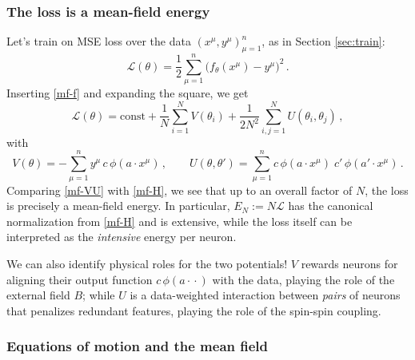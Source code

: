 \documentclass[11pt]{article}
\newcommand{\CL}{{\mathcal L}}
\begin{document}
\subsubsection{The loss is a mean-field energy}

Let's train on MSE loss over the data $(x^\mu,y^\mu)_{\mu=1}^n$, as in Section \ref{sec:train}:
%
\begin{equation}
    \CL(\theta) = \frac{1}{2}\sum_{\mu=1}^n \big(f_\theta(x^\mu)-y^\mu\big)^2\,.
\end{equation}
%
Inserting \eqref{mf-f} and expanding the square, we get
%
\begin{equation} \label{mf-VU}
    \CL(\theta) = \text{const} + \frac{1}{N}\sum_{i=1}^N V(\theta_i) + \frac{1}{2N^2}\sum_{i,j=1}^N U(\theta_i,\theta_j)\,,
\end{equation}
%
with
%
\begin{equation} \label{mf-VU-def}
    V(\theta) = -\sum_{\mu=1}^n y^\mu\, c\,\phi(a\cdot x^\mu)\,,\qquad
    U(\theta,\theta') = \sum_{\mu=1}^n c\,\phi(a\cdot x^\mu)\; c'\,\phi(a'\cdot x^\mu)\,.
\end{equation}
%
Comparing \eqref{mf-VU} with \eqref{mf-H}, we see that up to an overall factor of $N$, the loss is precisely a mean-field energy. In particular, $E_N:=N\CL$ has the canonical normalization from \eqref{mf-H} and is extensive, while the loss itself can be interpreted as the \emph{intensive} energy per neuron.

We can also identify physical roles for the two potentials! 
$V$ rewards neurons for aligning their output function $c\,\phi(a\cdot{}\cdot)$ with the data, playing the role of the external field $B$; while $U$ is a data-weighted interaction between \emph{pairs} of neurons that penalizes redundant features, playing the role of the spin-spin coupling.

\subsubsection{Equations of motion and the mean field}
\end{document}
